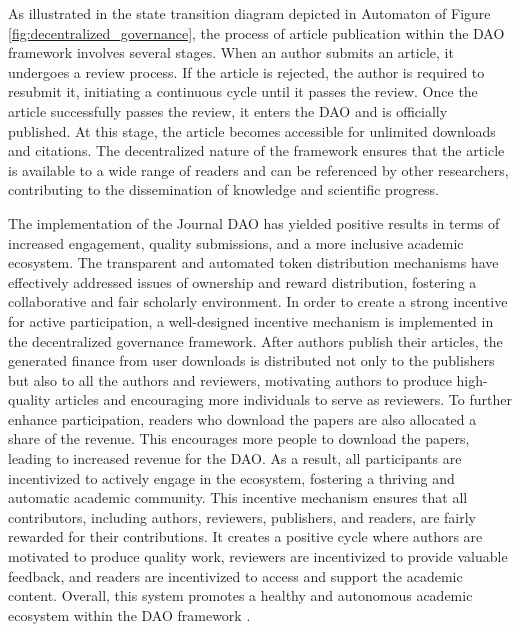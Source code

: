 \documentclass[lettersize,journal]{IEEEtran}
\begin{document}
As illustrated in the state transition diagram depicted in Automaton of Figure \ref{fig:decentralized_governance}, the process of article publication within the DAO framework involves several stages. When an author submits an article, it undergoes a review process. If the article is rejected, the author is required to resubmit it, initiating a continuous cycle until it passes the review.
Once the article successfully passes the review, it enters the DAO and is officially published. At this stage, the article becomes accessible for unlimited downloads and citations. The decentralized nature of the framework ensures that the article is available to a wide range of readers and can be referenced by other researchers, contributing to the dissemination of knowledge and scientific progress.


The implementation of the Journal DAO has yielded positive results in terms of increased engagement, quality submissions, and a more inclusive academic ecosystem. The transparent and automated token distribution mechanisms have effectively addressed issues of ownership and reward distribution, fostering a collaborative and fair scholarly environment.
In order to create a strong incentive for active participation, a well-designed incentive mechanism is implemented in the decentralized governance framework. After authors publish their articles, the generated finance from user downloads is distributed not only to the publishers but also to all the authors and reviewers, motivating authors to produce high-quality articles and encouraging more individuals to serve as reviewers.
To further enhance participation, readers who download the papers are also allocated a share of the revenue. This encourages more people to download the papers, leading to increased revenue for the DAO. As a result, all participants are incentivized to actively engage in the ecosystem, fostering a thriving and automatic academic community.
This incentive mechanism ensures that all contributors, including authors, reviewers, publishers, and readers, are fairly rewarded for their contributions. It creates a positive cycle where authors are motivated to produce quality work, reviewers are incentivized to provide valuable feedback, and readers are incentivized to access and support the academic content. Overall, this system promotes a healthy and autonomous academic ecosystem within the DAO framework \cite{bolton1998corporate}.
\end{document}
